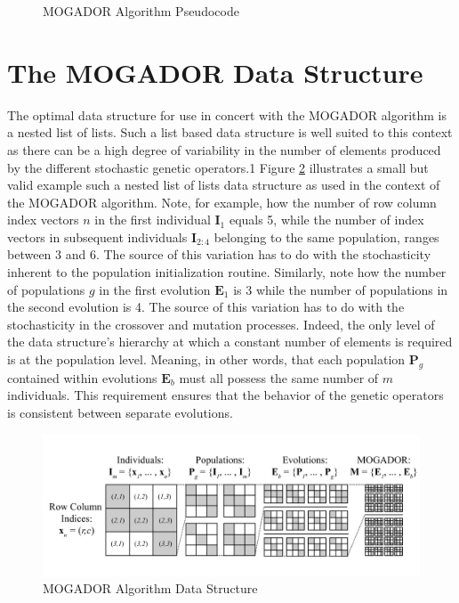             \begin{figure}[MOGADOR Algorithm Pseudocode]
            \caption[MOGADOR Algorithm Pseudocode]{MOGADOR Algorithm Pseudocode}
            \label{fig:mogador-pseudocode}
            \end{figure}
    
\section{The MOGADOR Data Structure}
    
The optimal data structure for use in concert with the MOGADOR algorithm is a nested list of lists. Such a list based data structure is well suited to this context as there can be a high degree of variability in the number of elements produced by the different stochastic genetic operators.1 Figure \ref{fig:data-structure} illustrates a small but valid example such a nested list of lists data structure as used in the context of the MOGADOR algorithm. Note, for example, how the number of row column index vectors $n$ in the first individual $\textbf{I}_1$ equals 5, while the number of index vectors in subsequent individuals $\textbf{I}_{2:4}$ belonging to the same population, ranges between 3 and 6. The source of this variation has to do with the stochasticity inherent to the population initialization routine. Similarly, note how the number of populations $g$ in the first evolution $\textbf{E}_1$ is 3 while the number of populations in the second evolution is 4. The source of this variation has to do with the stochasticity in the crossover and mutation processes. Indeed, the only level of the data structure's hierarchy at which a constant number of elements is required is at the population level. Meaning, in other words, that each population $\textbf{P}_g$ contained within evolutions $\textbf{E}_b$ must all possess the same number of $m$ individuals. This requirement ensures that the behavior of the genetic operators is consistent between separate evolutions.
            
            \begin{figure}[MOGADOR Algorithm Data Structure]
            \centering
            \includegraphics[width=5.5in]{figures/data-structure.png}   
            \caption[MOGADOR Algorithm Data Structure]{MOGADOR Algorithm Data Structure}
            \label{fig:data-structure}
            \end{figure}

